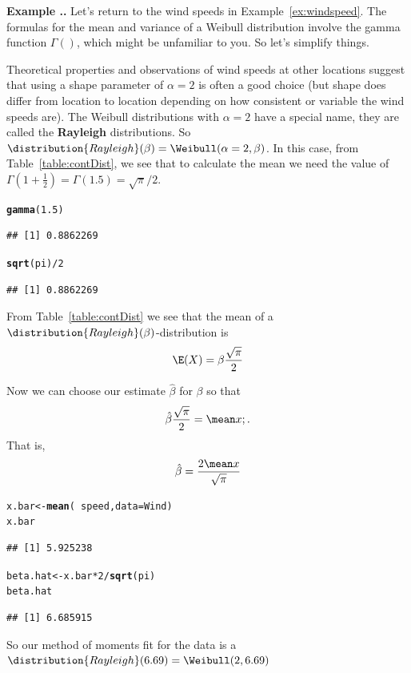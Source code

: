\documentclass[twoside]{book}\usepackage[]{graphicx}\usepackage[]{xcolor}
\makeatletter
\newcommand{\hlnum}[1]{\textcolor[rgb]{0.686,0.059,0.569}{#1}}%
\newcommand{\hlopt}[1]{\textcolor[rgb]{0,0,0}{#1}}%
\newcommand{\hlstd}[1]{\textcolor[rgb]{0.345,0.345,0.345}{#1}}%
\newcommand{\hlkwb}[1]{\textcolor[rgb]{0.69,0.353,0.396}{#1}}%
\newcommand{\hlkwc}[1]{\textcolor[rgb]{0.333,0.667,0.333}{#1}}%
\newcommand{\hlkwd}[1]{\textcolor[rgb]{0.737,0.353,0.396}{\textbf{#1}}}%
\newenvironment{kframe}{%
 \def\at@end@of@kframe{}%
 \ifinner\ifhmode%
  \def\at@end@of@kframe{\end{minipage}}%
  \begin{minipage}{\columnwidth}%
 \fi\fi%
 \def\FrameCommand##1{\hskip\@totalleftmargin \hskip-\fboxsep
 \colorbox{shadecolor}{##1}\hskip-\fboxsep
     \hskip-\linewidth \hskip-\@totalleftmargin \hskip\columnwidth}%
 \MakeFramed {\advance\hsize-\width
   \@totalleftmargin\z@ \linewidth\hsize
   \@setminipage}}%
 {\par\unskip\endMakeFramed%
 \at@end@of@kframe}
\newenvironment{knitrout}{}{} %
\def\Rayleigh{\distribution{Rayleigh}}
\def\term#1{\textbf{#1}}
\newcounter{example}[section]
\newenvironment{example}%
{\refstepcounter{example}%
\textbf{Example \thesection.\arabic{example}. }}%
{}
\makeatother
\begin{document}
\begin{example}
	Let's return to the wind speeds in Example~\ref{ex:windspeed}.
	The formulas for the mean and variance of a Weibull distribution involve
	the gamma function $\Gamma()$, which might be unfamiliar to you.  So let's 
	simplify things.

	Theoretical properties and observations of wind speeds at other locations 
	suggest that using a shape parameter of $\alpha=2$ is often a good choice (but 
	shape does differ from location to location depending on how consistent or 
	variable the wind speeds are).
	The Weibull distributions with $\alpha=2$ have a special name, they are 
	called the \term{Rayleigh} distributions.  
	So $\Rayleigh(\beta) = \Weibull(\alpha=2, \beta)$.
	In this case, from Table~\ref{table:contDist}, we see that to calculate 
	the mean we need the value of $\Gamma(1 + \frac{1}{2}) = \Gamma(1.5) = \sqrt{\pi}/2$.
\begin{knitrout}
\color{fgcolor}\begin{kframe}
\begin{alltt}
\hlkwd{gamma}\hlstd{(}\hlnum{1.5}\hlstd{)}
\end{alltt}
\begin{verbatim}
## [1] 0.8862269
\end{verbatim}
\begin{alltt}
\hlkwd{sqrt}\hlstd{(pi)}\hlopt{/}\hlnum{2}
\end{alltt}
\begin{verbatim}
## [1] 0.8862269
\end{verbatim}
\end{kframe}
\end{knitrout}
	From Table~\ref{table:contDist} we see that the mean of a 
	$\Rayleigh(\beta)$-distribution is 
	\[
	\E(X) = \beta \frac{\sqrt{\pi}}{2}
	\]

	Now we can choose our estimate $\hat \beta$ for $\beta$ so that 
	\[
	\hat \beta \frac{\sqrt{\pi}}{2} = \mean x  ;.
	\]
	That is,
	\[
	\hat\beta = \frac{2 \mean x }{\sqrt{\pi}}
	\]
\begin{knitrout}
\color{fgcolor}\begin{kframe}
\begin{alltt}
\hlstd{x.bar} \hlkwb{<-} \hlkwd{mean}\hlstd{(}\hlopt{~}\hlstd{speed,} \hlkwc{data} \hlstd{= Wind)}
\hlstd{x.bar}
\end{alltt}
\begin{verbatim}
## [1] 5.925238
\end{verbatim}
\begin{alltt}
\hlstd{beta.hat} \hlkwb{<-} \hlstd{x.bar} \hlopt{*} \hlnum{2}\hlopt{/}\hlkwd{sqrt}\hlstd{(pi)}
\hlstd{beta.hat}
\end{alltt}
\begin{verbatim}
## [1] 6.685915
\end{verbatim}
\end{kframe}
\end{knitrout}
So our method of moments fit for the data is a 
$\Rayleigh(6.69) = \Weibull(2, 6.69)$


\end{example}
\end{document}
